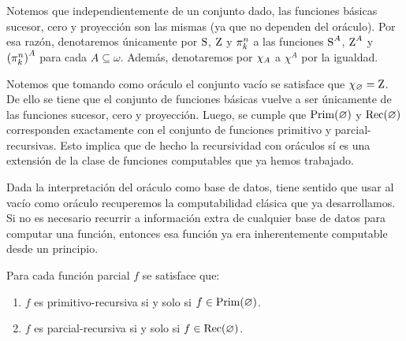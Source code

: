 \begin{notation}
	Notemos que independientemente de un conjunto dado, las funciones básicas sucesor, cero y proyección son las mismas (ya que no dependen del oráculo). Por esa razón, denotaremos únicamente por $\SUCESOR$, $\CERO$ y $\PROYECCION{n}{k}$ a las funciones $\SUCESOR^{A}$, $\CERO^{A}$ y $\pa*{\PROYECCION{n}{k}}^{A}$ para cada $A\subseteq\omega$. Además, denotaremos por $\CARACTERISTICA{A}$ a $\chi^{A}$ por la igualdad.
\end{notation}

Notemos que tomando como oráculo el conjunto vacío se satisface que $\CARACTERISTICA{\varnothing} =\CERO$. De ello se tiene que el conjunto de funciones básicas vuelve a ser únicamente de las funciones sucesor, cero y proyección. Luego, se cumple que $\PRIMITIVO\pa*{\varnothing}$ y $\RECURSIVO\pa*{\varnothing}$ corresponden exactamente con el conjunto de funciones primitivo y parcial-recursivas. Esto implica que de hecho la recursividad con oráculos sí es una extensión de la clase de funciones computables que ya hemos trabajado.

Dada la interpretación del oráculo como base de datos, tiene sentido que usar al vacío como oráculo recuperemos la computabilidad clásica que ya desarrollamos. Si no es necesario recurrir a información extra de cualquier base de datos para computar una función, entonces esa función ya era inherentemente computable desde un principio.

\begin{theorem}
	Para cada función parcial $f$ se satisface que:
	\begin{enumerate}
		\item $f$ es primitivo-recursiva si y solo si $f\in\PRIMITIVO\pa*{\varnothing}$.
		\item $f$ es parcial-recursiva si y solo si $f\in\RECURSIVO\pa*{\varnothing}$.
	\end{enumerate}
\end{theorem}

